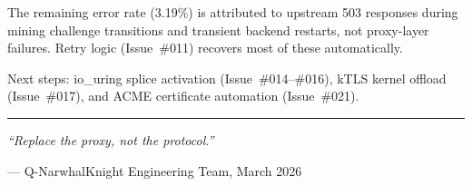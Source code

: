 \documentclass[a4paper, 11pt]{article}
\begin{document}
The remaining error rate (3.19\%) is attributed to upstream 503 responses
during mining challenge transitions and transient backend restarts, not
proxy-layer failures.  Retry logic (Issue~\#011) recovers most of these
automatically.

Next steps: io\_uring splice activation (Issue~\#014--\#016), kTLS kernel
offload (Issue~\#017), and ACME certificate automation (Issue~\#021).

\vspace{1em}
\begin{center}
\rule{0.5\textwidth}{0.5pt}

\vspace{0.5em}
{\small\textit{``Replace the proxy, not the protocol.''}}

\vspace{0.3em}
{\footnotesize --- Q-NarwhalKnight Engineering Team, March 2026}
\end{center}
\end{document}
